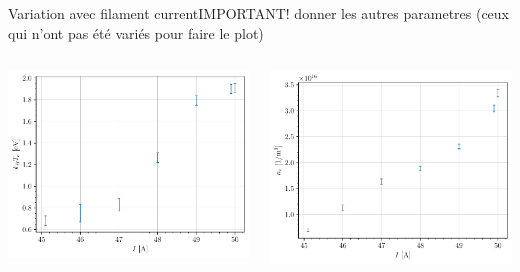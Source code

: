 \documentclass[10pt]{beamer}
\begin{document}
\begin{frame}{Variation avec filament current}{IMPORTANT! donner les autres parametres (ceux qui n'ont pas été variés pour faire le plot)}
    \begin{columns}
        \centering
        \includegraphics[width=\textwidth]{../figures/temperatureeV_current.pdf}


        \centering
        \includegraphics[width=\textwidth]{../figures/density_current.pdf}

    \end{columns}
\end{frame}
\end{document}
